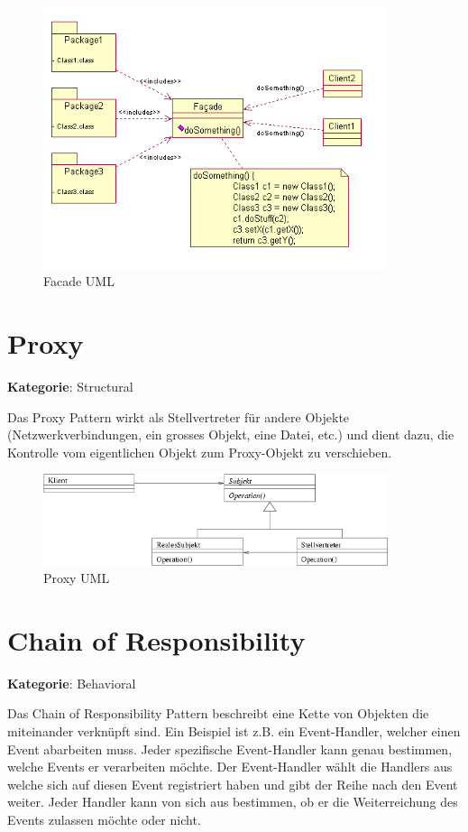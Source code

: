 \begin{figure}[H]
	\centering
	\includegraphics[width=0.9\textwidth]{content/gof/images/10-facade-uml.png}
	\caption{Facade UML}
\end{figure}


\section{Proxy}
\textbf{Kategorie}: Structural

Das Proxy Pattern wirkt als Stellvertreter für andere Objekte (Netzwerkverbindungen, ein grosses Objekt, eine Datei, etc.) und dient dazu, die Kontrolle vom eigentlichen Objekt zum Proxy-Objekt zu verschieben.

\begin{figure}[H]
	\centering
	\includegraphics[width=0.9\textwidth]{content/gof/images/11-proxy-uml.png}
	\caption{Proxy UML}
\end{figure}


\section{Chain of Responsibility}
\textbf{Kategorie}: Behavioral

Das Chain of Responsibility Pattern beschreibt eine Kette von Objekten die miteinander verknüpft sind. Ein Beispiel ist z.B. ein Event-Handler, welcher einen Event abarbeiten muss. Jeder spezifische Event-Handler kann genau bestimmen, welche Events er verarbeiten möchte. Der Event-Handler wählt die Handlers aus welche sich auf diesen Event registriert haben und gibt der Reihe nach den Event weiter. Jeder Handler kann von sich aus bestimmen, ob er die Weiterreichung des Events zulassen möchte oder nicht.

